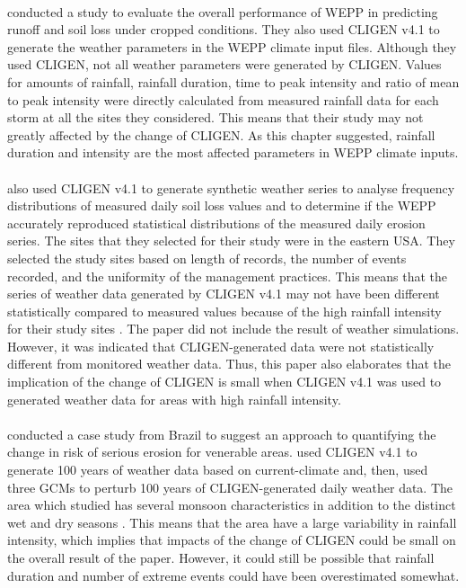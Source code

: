 \paragraph{\citet{zhang1996-855}} conducted a study to evaluate the overall
performance of
WEPP in predicting runoff and soil loss under cropped conditions. They also used
CLIGEN v4.1 to generate the weather parameters in the WEPP climate input files.
Although they used CLIGEN, not all weather parameters were generated by CLIGEN.
Values for amounts of rainfall, rainfall duration, time to peak intensity and
ratio of mean to peak intensity were directly calculated from measured rainfall
data for each storm at all the sites they considered. This means that their
study may not greatly affected by the change of CLIGEN. As this chapter
suggested, rainfall duration and intensity are the most affected parameters in
WEPP climate inputs.

\paragraph{\citet{baffaut1998-756}} also used CLIGEN v4.1 to generate synthetic
weather series to analyse frequency distributions of measured daily soil loss
values and to determine if the WEPP accurately reproduced statistical
distributions of the measured daily erosion series. The sites that they selected
for their study were in the eastern USA. They selected the study sites based on
length of records, the number of events recorded, and the uniformity of the
management practices. This means that the series of weather data generated by
CLIGEN v4.1 may not have been different statistically compared to measured
values because of the high rainfall intensity for their study sites
\citep{ashley2003-3003}.
The paper did not include the result of weather simulations. However, it
was indicated that CLIGEN-generated data were not statistically different from
monitored weather data. Thus, this paper also elaborates that the implication of
the change of CLIGEN is small when CLIGEN v4.1 was used to generated weather
data for areas with high rainfall intensity.

\paragraph{\citet{favis-mortlock1999-329}} conducted a case study from Brazil to
suggest an
approach to quantifying the change in risk of serious erosion for venerable
areas. \citet{favis-mortlock1999-329} used CLIGEN v4.1 to generate 100 years of
weather data based on current-climate and, then, used three GCMs to perturb 100
years of CLIGEN-generated daily weather data. The area which
\citet{favis-mortlock1999-329} studied has several monsoon characteristics in
addition to the distinct wet and dry seasons \citep{gan2004-47}. This means
that the area have a large variability in rainfall intensity, which implies
that impacts of the change of CLIGEN could be small on the overall result of the
paper. However, it could still be possible that rainfall duration and number of
extreme events could have been overestimated somewhat.

